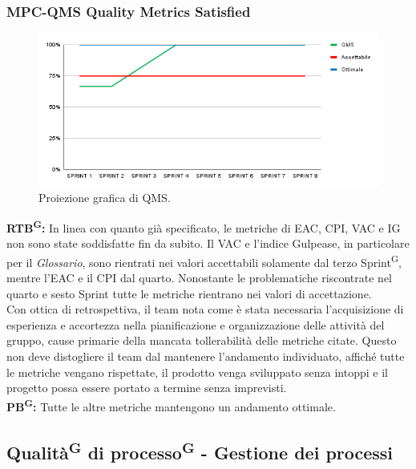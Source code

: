 \documentclass[8pt]{article}
\newcommand{\glossterm}[1]{#1\textsuperscript{G}} %
\begin{document}
\subsubsection{MPC-QMS Quality Metrics Satisfied}
\begin{figure}[h!]
    \centering
    \includegraphics[width=1\textwidth]{images_pdq/QMS.png}
    \caption{Proiezione grafica di QMS.}
    \label{fig:Proiezione grafica di QMS}
\end{figure}
\textbf{\glossterm{RTB}:} In linea con quanto già specificato, le metriche di EAC, CPI, VAC e IG non sono state soddisfatte fin da subito. Il VAC e l'indice Gulpease, in particolare per il \textit{Glossario}, sono rientrati nei valori accettabili solamente dal terzo \glossterm{Sprint}, mentre l'EAC e il CPI dal quarto. Nonostante le problematiche riscontrate nel quarto e sesto Sprint tutte le metriche rientrano nei valori di accettazione. \\Con ottica di retrospettiva, il team nota come è stata necessaria l'acquisizione di esperienza e accortezza nella pianificazione e organizzazione delle attività del gruppo, cause primarie della mancata tollerabilità delle metriche citate. Questo non deve distogliere il team dal mantenere l'andamento individuato, affiché tutte le metriche vengano rispettate, il prodotto venga sviluppato senza intoppi e il progetto possa essere portato a termine senza imprevisti.\\
\textbf{\glossterm{PB}:}  Tutte le altre metriche mantengono un andamento ottimale.
\clearpage
\subsection{\glossterm{Qualità} di \glossterm{processo} - Gestione dei processi}
\end{document}
